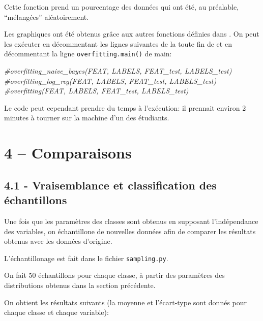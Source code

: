 \documentclass[
]{article}
\newenvironment{Shaded}{}{}
\newcommand{\CommentTok}[1]{\textcolor[rgb]{0.38,0.63,0.69}{\textit{#1}}}
\begin{document}
Cette fonction prend un pourcentage des données qui ont été, au
préalable, ``mélangées'' aléatoirement.

Les graphiques ont été obtenus grâce aux autres fonctions définies dans
. On peut les exécuter en décommentant les lignes
suivantes de la toute fin de  et en décommentant la
ligne \texttt{overfitting.main()} de main:

\begin{Shaded}
\begin{Highlighting}[]
\CommentTok{\#overfitting\_naive\_bayes(FEAT, LABELS, FEAT\_test, LABELS\_test)}
\CommentTok{\#overfitting\_log\_reg(FEAT, LABELS, FEAT\_test, LABELS\_test)}
\CommentTok{\#overfitting(FEAT, LABELS, FEAT\_test, LABELS\_test)}
\end{Highlighting}
\end{Shaded}

Le code peut cependant prendre du temps à l'exécution: il prennait
environ 2 minutes à tourner sur la machine d'un des étudiants.

\newpage{}

\hypertarget{comparaisons}{%
\section{4 -- Comparaisons}\label{comparaisons}}

\hypertarget{vraisemblance-et-classification-des-uxe9chantillons}{%
\subsection{4.1 - Vraisemblance et classification des
échantillons}\label{vraisemblance-et-classification-des-uxe9chantillons}}

Une fois que les paramètres des classes sont obtenus en supposant
l'indépendance des variables, on échantillone de nouvelles données afin
de comparer les résultats obtenus avec les données d'origine.

L'échantillonage est fait dans le fichier \texttt{sampling.py}.

On fait 50 échantillons pour chaque classe, à partir des paramètres des
distributions obtenus dans la section précédente.

On obtient les résultats suivants (la moyenne et l'écart-type sont
donnés pour chaque classe et chaque variable):
\end{document}

